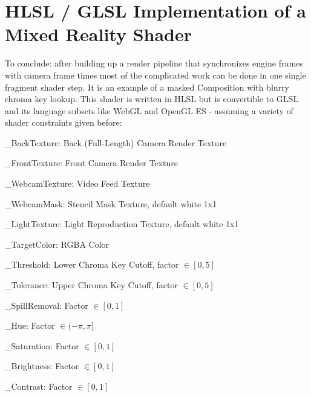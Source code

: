 \chapter{HLSL / GLSL Implementation of a Mixed Reality Shader}


To conclude: after building up a render pipeline that synchronizes engine 
frames with camera frame times most of the complicated work can be done in one 
single fragment shader step. It is an example of a masked Composition with 
blurry chroma key lookup. This shader is written in HLSL but is convertible 
to GLSL and its language subsets like WebGL and OpenGL ES - assuming a variety 
of shader constraints given before:


\begin{my_list}
	\item \_BackTexture: Back (Full-Length) Camera Render Texture
	\item \_FrontTexture: Front Camera Render Texture
	\item \_WebcamTexture: Video Feed Texture
	\item \_WebcamMask: Stencil Mask Texture, default white 1x1
	\item \_LightTexture: Light Reproduction Texture, default white 1x1
	\item \_TargetColor: RGBA Color
	\item \_Threshold: Lower Chroma Key Cutoff, factor $\in [0, 5]$
	\item \_Tolerance: Upper Chroma Key Cutoff, factor $\in [0, 5]$
	\item \_SpillRemoval: Factor $\in [0, 1]$
	\item \_Hue: Factor $\in (-\pi, \pi]$
	\item \_Saturation: Factor $\in [0, 1]$
	\item \_Brightness: Factor $\in [0, 1]$
	\item \_Contrast: Factor $\in [0, 1]$
\end{my_list}

